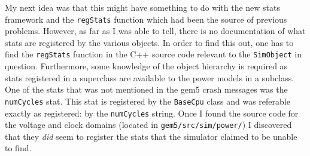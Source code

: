 My next idea was that this might have something to do with the new stats 
framework and the \texttt{regStats} function which had been the source of 
previous problems. However, as far as I was able to tell, there is no 
documentation of what stats are registered by the various objects. In order 
to find this out, one has to find the \texttt{regStats} function in the C++ 
source code relevant to the \texttt{SimObject} in question. Furthermore, 
some knowledge of the object hierarchy is required as stats registered in a 
superclass are available to the power models in a subclass. One of the stats
that was not mentioned in the gem5 crash messages was the \texttt{numCycles}
stat. This stat is registered by the \texttt{BaseCpu} class and was
referable exactly as registered: by the \texttt{numCycles} string. Once I
found the source code for the voltage and clock domains (located in 
\texttt{gem5/src/sim/power/}) I discovered that they \textit{did} seem to 
register the stats that the simulator claimed to be unable to find.
